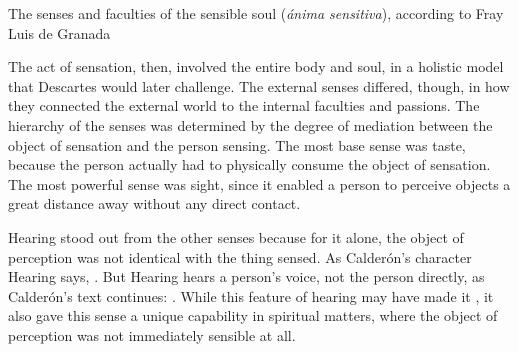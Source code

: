 \begin{table}
    \caption{The senses and faculties of the sensible soul (\emph{ánima
    sensitiva}), according to Fray Luis de Granada}
    
    \label{tab:senses-fray-luis}

\end{table}

The act of sensation, then, involved the entire body and soul, in a holistic
model that Descartes would later challenge.  
The external senses differed, though, in how they connected the external world
to the internal faculties and passions.
The hierarchy of the senses was determined by the degree of mediation between
the object of sensation and the person sensing.
The most base sense was taste, because the person actually had to physically
consume the object of sensation.
The most powerful sense was sight, since it enabled a person to perceive objects
a great distance away without any direct contact.

Hearing stood out from the other senses because for it alone, the object of
perception was not identical with the thing sensed.
As Calderón's character Hearing says, .%
    \Autocite[]{Calderon:Retiro}
But Hearing hears a person's voice, not the person directly, as Calderón's text
continues: .%
    \Autocite[]{Calderon:Retiro}
While this feature of hearing may have made it , it also
gave this sense a unique capability in spiritual matters, where the object of
perception was not immediately sensible at all.

